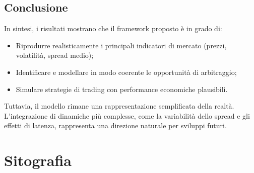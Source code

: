 \documentclass[10pt,final]{article}
\begin{document}
\subsection{Conclusione}

In sintesi, i risultati mostrano che il framework proposto è in grado di:

\begin{itemize}
    \item Riprodurre realisticamente i principali indicatori di mercato (prezzi, volatilità, spread medio);
    \item Identificare e modellare in modo coerente le opportunità di arbitraggio;
    \item Simulare strategie di trading con performance economiche plausibili.
\end{itemize}

Tuttavia, il modello rimane una rappresentazione semplificata della realtà. L'integrazione di dinamiche più complesse, come la variabilità dello spread e gli effetti di latenza, rappresenta una direzione naturale per sviluppi futuri.

\section{Sitografia}
\end{document}
